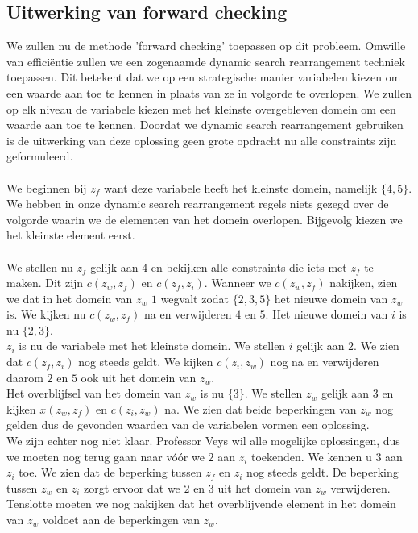 \documentclass[alternative-exam.tex]{subfiles}
\begin{document}
\subsection{Uitwerking van forward checking}
We zullen nu de methode 'forward checking' toepassen op dit probleem. Omwille van effici\"entie zullen we een zogenaamde dynamic search rearrangement techniek toepassen. Dit betekent dat we op een strategische manier variabelen kiezen om een waarde aan toe te kennen in plaats van ze in volgorde te overlopen. We zullen op elk niveau de variabele kiezen met het kleinste overgebleven domein om een waarde aan toe te kennen.
Doordat we dynamic search rearrangement gebruiken is de uitwerking van deze oplossing geen grote opdracht nu alle constraints zijn geformuleerd.\\\\
We beginnen bij $z_f$ want deze variabele heeft het kleinste domein, namelijk $\{4,5\}$. We hebben in onze dynamic search rearrangement regels niets gezegd over de volgorde waarin we de elementen van het domein overlopen. Bijgevolg kiezen we het kleinste element eerst.\\\\
We stellen nu $z_f$ gelijk aan $4$ en bekijken alle constraints die iets met $z_f$ te maken. Dit zijn $c(z_w,z_f)$ en $c(z_f,z_i)$. Wanneer we $c(z_w,z_f)$ nakijken, zien we dat in het domein van $z_w$ $1$ wegvalt zodat $\{2,3,5\}$ het nieuwe domein van $z_w$ is. We kijken nu $c(z_w,z_f)$ na en verwijderen $4$ en $5$. Het nieuwe domein van $i$ is nu $\{2,3\}$.\\
$z_i$ is nu de variabele met het kleinste domein. We stellen $i$ gelijk aan $2$. We zien dat $c(z_f,z_i)$ nog steeds geldt. We kijken $c(z_i,z_w)$ nog na en verwijderen daarom $2$ en $5$ ook uit het domein van $z_w$.\\ Het overblijfsel van het domein van $z_w$ is nu $\{3\}$. We stellen $z_w$ gelijk aan $3$ en kijken $x(z_w,z_f)$ en $c(z_i,z_w)$ na. We zien dat beide beperkingen van $z_w$ nog gelden dus de gevonden waarden van de variabelen vormen een oplossing.\\We zijn echter nog niet klaar. Professor Veys wil alle mogelijke oplossingen, dus we moeten nog terug gaan naar v\'o\'or we $2$ aan $z_i$ toekenden. We kennen u $3$ aan $z_i$ toe. We zien dat de beperking tussen $z_f$ en $z_i$ nog steeds geldt. De beperking tussen $z_w$ en $z_i$ zorgt ervoor dat we $2$ en $3$ uit het domein van $z_w$ verwijderen. Tenslotte moeten we nog nakijken dat het overblijvende element in het domein van $z_w$ voldoet aan de beperkingen van $z_w$.
\end{document}
